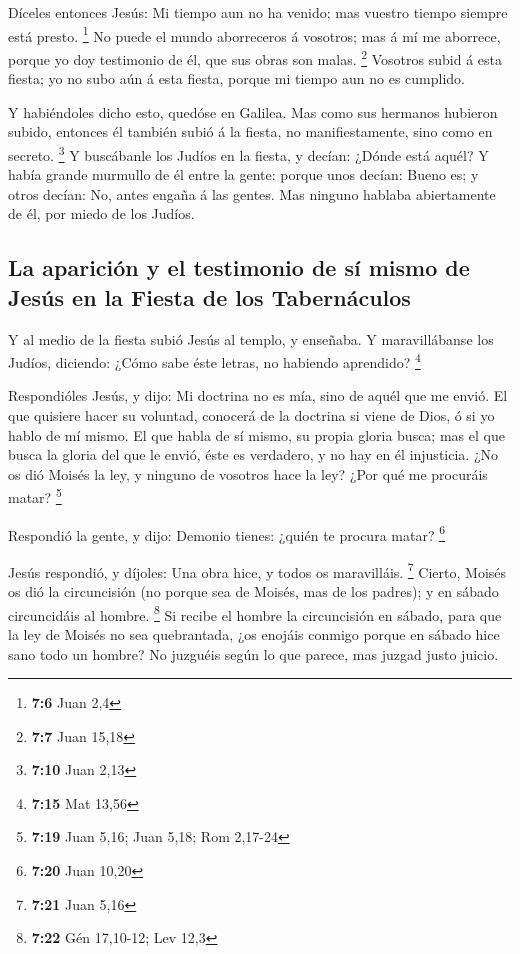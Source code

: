  Díceles entonces Jesús: Mi tiempo aun no ha venido; mas
vuestro tiempo siempre está presto. \footnote{\textbf{7:6} Juan 2,4}
 No puede el mundo aborreceros á vosotros; mas á mí me
aborrece, porque yo doy testimonio de él, que sus obras son malas.
\footnote{\textbf{7:7} Juan 15,18}  Vosotros subid á esta
fiesta; yo no subo aún á esta fiesta, porque mi tiempo aun no es
cumplido.

 Y habiéndoles dicho esto, quedóse en Galilea.
 Mas como sus hermanos hubieron subido, entonces él
también subió á la fiesta, no manifiestamente, sino como en secreto.
\footnote{\textbf{7:10} Juan 2,13}  Y buscábanle los
Judíos en la fiesta, y decían: ¿Dónde está aquél?  Y
había grande murmullo de él entre la gente: porque unos decían: Bueno
es; y otros decían: No, antes engaña á las gentes.  Mas
ninguno hablaba abiertamente de él, por miedo de los Judíos.

\hypertarget{la-apariciuxf3n-y-el-testimonio-de-suxed-mismo-de-jesuxfas-en-la-fiesta-de-los-tabernuxe1culos}{%
\subsection{La aparición y el testimonio de sí mismo de Jesús en la
Fiesta de los
Tabernáculos}\label{la-apariciuxf3n-y-el-testimonio-de-suxed-mismo-de-jesuxfas-en-la-fiesta-de-los-tabernuxe1culos}}

 Y al medio de la fiesta subió Jesús al templo, y
enseñaba.  Y maravillábanse los Judíos, diciendo: ¿Cómo
sabe éste letras, no habiendo aprendido? \footnote{\textbf{7:15} Mat
  13,56}

 Respondióles Jesús, y dijo: Mi doctrina no es mía, sino
de aquél que me envió.  El que quisiere hacer su
voluntad, conocerá de la doctrina si viene de Dios, ó si yo hablo de mí
mismo.  El que habla de sí mismo, su propia gloria busca;
mas el que busca la gloria del que le envió, éste es verdadero, y no hay
en él injusticia.  ¿No os dió Moisés la ley, y ninguno de
vosotros hace la ley? ¿Por qué me procuráis matar? \footnote{\textbf{7:19}
  Juan 5,16; Juan 5,18; Rom 2,17-24}

 Respondió la gente, y dijo: Demonio tienes: ¿quién te
procura matar? \footnote{\textbf{7:20} Juan 10,20}

 Jesús respondió, y díjoles: Una obra hice, y todos os
maravilláis. \footnote{\textbf{7:21} Juan 5,16}  Cierto,
Moisés os dió la circuncisión (no porque sea de Moisés, mas de los
padres); y en sábado circuncidáis al hombre. \footnote{\textbf{7:22} Gén
  17,10-12; Lev 12,3}  Si recibe el hombre la
circuncisión en sábado, para que la ley de Moisés no sea quebrantada,
¿os enojáis conmigo porque en sábado hice sano todo un hombre?
 No juzguéis según lo que parece, mas juzgad justo
juicio.

